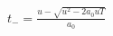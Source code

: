 \documentclass[border=2.5pt]{standalone}
\begin{document}
$\displaystyle t_-=\frac{u-\sqrt{u^2-2a_0uT}}{a_0}$
\end{document}
